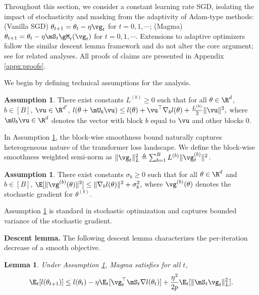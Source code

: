 \documentclass[11pt, a4paper, twocolumn, copyright, goog]{google}
\theoremstyle{plain}
\newtheorem{lemma}[theorem]{Lemma}
\theoremstyle{definition}
\newtheorem{assumption}[theorem]{Assumption}
\theoremstyle{remark}
\begin{document}
Throughout this section, we consider a constant learning rate SGD, isolating the impact of stochasticity and masking from the adaptivity of Adam-type methods: (Vanilla SGD) $\theta_{t+1} = \theta_t - \eta \vg_t$ for $t = 0, 1, \cdots$; (Magma) $\theta_{t+1} = \theta_t - \eta \mS_t \gM_t(\vg_t)$ for $t = 0, 1, \cdots$.
Extensions to adaptive optimizers follow the similar descent lemma framework and do not alter the core argument; see \citet{wang2022divergence,crawshaw2022robustness} for related analyses.
All proofs of claims are presented in Appendix \ref{appx:proofs}.





We begin by defining technical assumptions for the analysis.


\begin{assumption} \label{assumption:layerwise_smooth}
    There exist constants $L^{(b)} \geq 0$ such that for all $\theta \in \R^d$, $b \in [B]$, $\vu \in \R^{d'}$, $l(\theta + \mU_b \vu) \leq l(\theta) + \vu^\top \nabla_b l(\theta) + \frac{L^{(b)}}{2} \| \vu  \|^2,$
    where $\mU_b \vu \in \R^d$ denotes the vector with block $b$ equal to $\vu$ and other blocks 0.  
\end{assumption}



In Assumption \ref{assumption:layerwise_smooth}, the block-wise smoothness bound naturally captures heterogeneous nature of the transformer loss landscape. We define the block-wise smoothness weighted semi-norm as $\| \vg_t \|_L^2 \triangleq \sum_{b=1}^{B} L^{(b)} \| \vg_t^{(b)} \|^2$.


\begin{assumption} \label{assumption:layerwise_second_moment}
    There exist constants $\sigma_b \geq 0$ such that for all $\theta \in \R^d$ and $b \in [B]$, $\E [ \| \vg^{(b)}(\theta) \|^2 ] \leq \| \nabla_b l(\theta) \|^2 + \sigma_b^2,$ where $\vg^{(b)}(\theta)$ denotes the stochastic gradient for $\theta^{(b)}$.
\end{assumption}

Assumption \ref{assumption:layerwise_second_moment} is standard in stochastic optimization and captures bounded variance of the stochastic gradient.






\textbf{Descent lemma.} 
The following descent lemma characterizes the per-iteration decrease of a smooth objective.

\begin{lemma} \label{prop:magma_descent}
    Under Assumption \ref{assumption:layerwise_smooth}, Magma satisfies for all $t$, 
    \begin{equation} \label{eq:one_step_descent_magma}
        \E_t[l(\theta_{t+1})] 
            \leq l(\theta_t) - \eta \E_t [\vg_t^\top \mS_t \nabla l(\theta_t)] + \frac{\eta^2}{2p} \E_t [\| \mS_t \vg_t \|_L^2 ].
    \end{equation}
\end{lemma}
\end{document}
